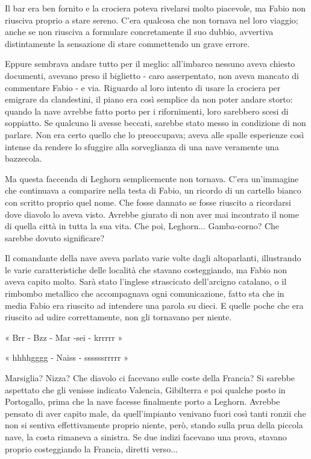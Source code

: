 Il bar era ben fornito e la crociera poteva rivelarsi molto piacevole, ma Fabio non riusciva proprio a stare sereno. C'era qualcosa che non tornava nel loro viaggio; anche se non riusciva a formulare concretamente il suo dubbio, avvertiva distintamente la sensazione di stare commettendo un grave errore.

Eppure sembrava andare tutto per il meglio: all'imbarco nessuno aveva chiesto documenti, avevano preso il biglietto - caro asserpentato, non aveva mancato di commentare Fabio - e via. Riguardo al loro intento di usare la crociera per emigrare da clandestini, il piano era così semplice da non poter andare storto: quando la nave avrebbe fatto porto per i rifornimenti, loro sarebbero scesi di soppiatto. Se qualcuno li avesse beccati, sarebbe stato messo in condizione di non parlare. Non era certo quello che lo preoccupava; aveva alle spalle esperienze così intense da rendere lo sfuggire alla sorveglianza di una nave veramente una bazzecola.

Ma questa faccenda di Leghorn semplicemente non tornava. C'era un'immagine che continuava a comparire nella testa di Fabio, un ricordo di un cartello bianco con scritto proprio quel nome. Che fosse dannato se fosse riuscito a ricordarsi dove diavolo lo aveva visto. Avrebbe giurato di non aver mai incontrato il nome di quella città in tutta la sua vita. Che poi, Leghorn... Gamba-corno? Che sarebbe dovuto significare?

Il comandante della nave aveva parlato varie volte dagli altoparlanti, illustrando le varie caratteristiche delle località che stavano costeggiando, ma Fabio non aveva capito molto. Sarà stato l'inglese strascicato dell'arcigno catalano, o il rimbombo metallico che accompagnava ogni comunicazione, fatto sta che in media Fabio era riuscito ad intendere una parola su dieci. E quelle poche che era riuscito ad udire correttamente, non gli tornavano per niente.

« Brr - Bzz - Mar -sei - krrrrr »

« hhhhgggg - Naiss - ssssssrrrrr »

Marsiglia? Nizza? Che diavolo ci facevano sulle coste della Francia? Si sarebbe aspettato che gli venisse indicato Valencia, Gibilterra e poi qualche posto in Portogallo, prima che la nave facesse finalmente porto a Leghorn. Avrebbe pensato di aver capito male, da quell'impianto venivano fuori così tanti ronzii che non si sentiva effettivamente proprio niente, però, stando sulla prua della piccola nave, la costa rimaneva a sinistra. Se due indizi facevano una prova, stavano proprio costeggiando la Francia, diretti verso...

